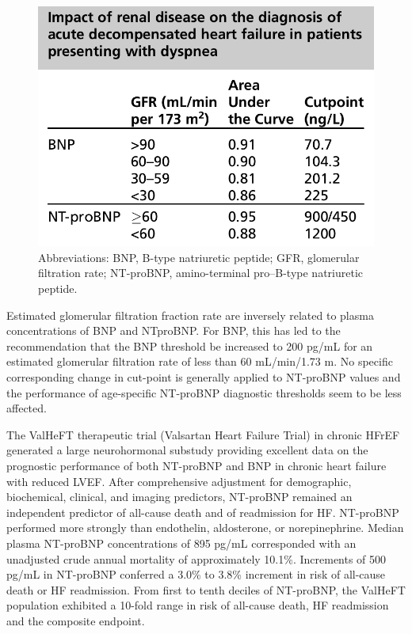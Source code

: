 \documentclass[14pt,a4paper,onecolumn]{extarticle}
\begin{document}
\begin{figure}   \includegraphics{../../images/NP_obesity.png}   \caption{Abbreviations: BNP, B-type natriuretic peptide; GFR, glomerular filtration rate; NT-proBNP, amino-terminal pro–B-type natriuretic peptide. \citep{DeFilippi2008}}   \label{NP_obesity} \end{figure} %


Estimated glomerular filtration fraction rate are inversely related to plasma concentrations of BNP and NTproBNP. For BNP, this has led to the recommendation that the BNP threshold be increased to 200 pg/mL for an estimated glomerular filtration rate of less than 60 mL/min/1.73 m. No specific corresponding change in cut-point is generally applied to NT-proBNP values and the performance of age-specific NT-proBNP diagnostic thresholds seem to be less affected. \citep{DeFilippi2008} %

The ValHeFT therapeutic trial (Valsartan Heart Failure Trial) in chronic HFrEF generated a large neurohormonal substudy providing excellent data on the prognostic performance of both NT-proBNP and BNP in chronic heart failure with reduced LVEF.  After comprehensive adjustment for demographic, biochemical, clinical, and imaging predictors, NT-proBNP remained an independent predictor of all-cause death and of readmission for HF. NT-proBNP performed more strongly than endothelin, aldosterone, or norepinephrine. Median plasma NT-proBNP concentrations of 895 pg/mL corresponded with an unadjusted crude annual mortality of approximately 10.1\%. Increments of 500 pg/mL in NT-proBNP conferred a 3.0\% to 3.8\% increment in risk of all-cause death or HF readmission. From first to tenth deciles of NT-proBNP, the ValHeFT population exhibited a 10-fold range in risk of all-cause death, HF readmission and the composite endpoint. \citep{bib3204} %
\end{document}
